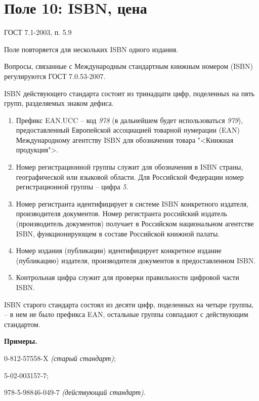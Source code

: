 \chapter{Поле 10: ISBN, цена}

ГОСТ 7.1-2003, п. 5.9 %

Поле повторяется для нескольких ISBN одного издания.
 
Вопросы, связанные с Международным стандартным книжным номером (ISBN) регулируются ГОСТ 7.0.53-2007.

ISBN действующего стандарта состоит из тринадцати цифр, поделенных на пять групп, разделяемых знаком дефиса.

\begin{enumerate}
    \item Префикс EAN.UCC -- код \emph{978} (в дальнейшем будет использоваться \emph{979}), предоставленный Европейской ассоциацией товарной нумерации (EAN) Международному агентству ISBN для обозначения товара "<Книжная продукция">.
    \item Номер регистрационной группы служит для обозначения в ISBN страны, географической или языковой области. Для Российской Федерации номер регистрационной группы -- цифра \emph{5}.
    \item Номер регистранта идентифицирует в системе ISBN конкретного издателя, производителя документов. Номер регистранта российский издатель (производитель документов) получает в Российском национальном агентстве ISBN, функционирующем в составе Российской книжной палаты.
    \item Номер издания (публикации) идентифицирует конкретное издание (публикацию) издателя, производителя документов в предоставленном ISBN.
    \item Контрольная цифра служит для проверки правильности цифровой части ISBN.
\end{enumerate}

ISBN старого стандарта состоял из десяти цифр, поделенных на четыре группы, -- в нем не было префикса EAN, остальные группы совпадают с действующим стандартом.

\textbf{Примеры.}

\begin{cutelist}
	\item 0-812-57558-X \emph{(старый стандарт)};
	\item 5-02-003157-7;
	\item 978-5-98846-049-7 \emph{(действующий стандарт)}.
\end{cutelist}


